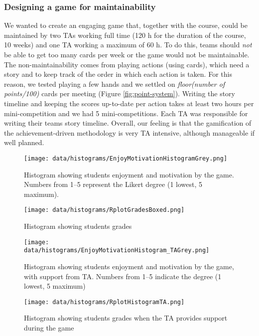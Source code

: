 \documentclass[
]{article}
\begin{document}
\hypertarget{designing-a-game-for-maintainability}{%
\subsubsection*{Designing a game for
maintainability}\label{designing-a-game-for-maintainability}}

We wanted to create an engaging game that, together with the course,
could be maintained by two TAs working full time (120 h for the duration
of the course, 10 weeks) and one TA working a maximum of 60 h. To do
this, teams should \emph{not} be able to get too many cards per week or
the game would not be maintainable. The non-maintainability comes from
playing actions (using cards), which need a story and to keep track of
the order in which each action is taken. For this reason, we tested
playing a few hands and we settled on
\textit{floor(number of points/100)} cards per meeting (Figure
\ref{fig:point-system}). Writing the story timeline and keeping the
scores up-to-date per action takes at least two hours per
mini-competition and we had 5 mini-competitions. Each TA was responsible
for writing their teams story timeline. Overall, our feeling is that the
gamification of the achievement-driven methodology is very TA intensive,
although manageable if well planned.

\begin{figure}[t]
\texttt{[image: data/histograms/EnjoyMotivationHistogramGrey.png]}
\caption{\label{fig:histogram-enjoy-motiv}Histogram showing students enjoyment and motivation by the game.
Numbers from 1--5 represent the Likert degree (1 lowest, 5 maximum).}
\end{figure}

\begin{figure}[t]
\texttt{[image: data/histograms/RplotGradesBoxed.png]}
\caption{\label{fig:game-grades}Histogram showing students grades}
\end{figure}

\begin{figure}[t]
\texttt{[image: data/histograms/EnjoyMotivationHistogram\_TAGrey.png]}
\caption{\label{fig:game-enjoy-support-ta}Histogram showing students enjoyment and motivation by the game,
with support from TA.
Numbers from 1--5 indicate the degree (1 lowest, 5 maximum)}
\end{figure}

\begin{figure}[t]
\texttt{[image: data/histograms/RplotHistogramTA.png]}
\caption{\label{fig:game-grades-support-ta}Histogram showing students grades
when the TA provides support during the game}
\end{figure}
\end{document}
